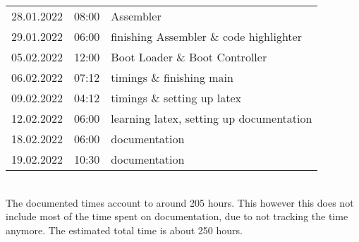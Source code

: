 \begin{tabular}{|p{21mm}|p{12mm}|p{70mm}|}
    28.01.2022 & 08:00 & Assembler \\
    29.01.2022 & 06:00 & finishing Assembler \& code highlighter \\
    05.02.2022 & 12:00 & Boot Loader \& Boot Controller \\
    06.02.2022 & 07:12 & timings \& finishing main \\
    09.02.2022 & 04:12 & timings \& setting up latex \\
    12.02.2022 & 06:00 & learning latex, setting up documentation \\
    18.02.2022 & 06:00 & documentation \\
    19.02.2022 & 10:30 & documentation \\
    \hline
\end{tabular}~\\

The documented times account to around 205 hours. This however this does not include most of the time spent on documentation, due to not tracking the time anymore.
The estimated total time is about 250 hours.